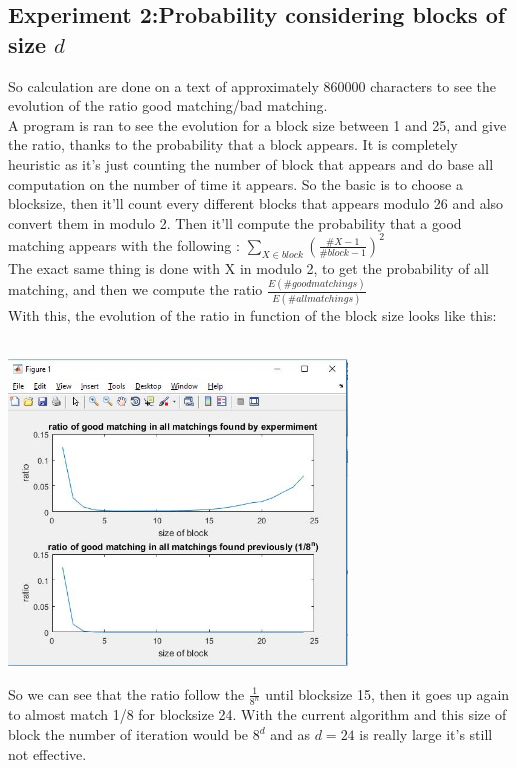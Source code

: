 \documentclass{article}
\begin{document}
\subsection*{Experiment 2:Probability considering blocks of size $d$}
So calculation are done on a text of approximately $860000$ characters to see the evolution of the ratio good matching/bad matching.\\
A program is ran to see the evolution for a block size between 1 and 25, and give the ratio, thanks to the probability that a block appears. It is completely heuristic as it's just counting the number of block that appears and do base all computation on the number of time it appears.
So the basic is to choose a blocksize, then it'll count every different blocks that appears modulo 26 and also convert them in modulo 2.
Then it'll compute the probability that a good matching appears with the following : $\sum_{X \in block}({\frac{\#X -1}{\#block -1}})^2 $\\
The exact same thing is done with X in modulo 2, to get the probability of all matching, and then we compute the ratio $\frac{E(\# good matchings)}{E(\# all matchings)}$\\
With this, the evolution of the ratio in function of the block size looks like this:\\
\\
\begin{center}
\includegraphics[width=90mm]{ratio.jpg}\\
\end{center}
So we can see that the ratio follow the $\frac{1}{8^n}$ until blocksize 15, then it goes up again to almost match 1/8 for blocksize 24. With the current algorithm and this size of block the number of iteration would be $8^d$ and as $d = 24$ is really large it's still not effective.\\
\end{document}
